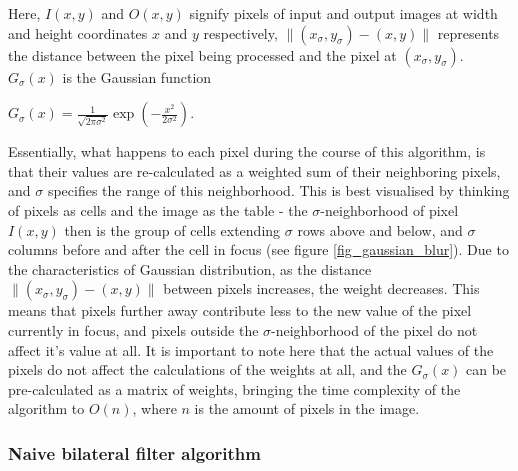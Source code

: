 \documentclass [12pt,a4paper]{report}
\begin{document}
\begin{center}
\begin{algorithm}[h]
\end{algorithm}
\end{center}

Here, $I(x,y)$ and $O(x,y)$ signify pixels of input and output images at width and height coordinates $x$ and $y$ respectively, $\| (x_\sigma, y_\sigma)-(x, y) \|$ represents the distance between the pixel being processed and the pixel at $(x_\sigma, y_\sigma)$. $G_\sigma(x)$ is the Gaussian function
\begin{center}
$G_\sigma(x) = \frac{1}{\sqrt{2\pi\sigma^2}} \exp(-\frac{x^2}{2\sigma^2})$.
\end{center}

Essentially, what happens to each pixel during the course of this algorithm, is that their values are re-calculated as a weighted sum of their neighboring pixels, and $\sigma$ specifies the range of this neighborhood. This is best visualised by thinking of pixels as cells and the image as the table - the $\sigma$-neighborhood of pixel $I(x,y)$ then is the group of cells extending $\sigma$ rows above and below, and $\sigma$ columns before and after the cell in focus (see figure \ref{fig_gaussian_blur}). Due to the characteristics of Gaussian distribution, as the distance $\| (x_\sigma, y_\sigma)-(x, y) \|$ between pixels increases, the weight decreases. This means that pixels further away contribute less to the new value of the pixel currently in focus, and pixels outside the $\sigma$-neighborhood of the pixel do not affect it's value at all. It is important to note here that the actual values of the pixels do not affect the calculations of the weights at all, and the $G_\sigma(x)$ can be pre-calculated as a matrix of weights, bringing the time complexity of the algorithm to $O(n)$, where $n$ is the amount of pixels in the image.

\subsubsection{Naive bilateral filter algorithm}
\end{document}
